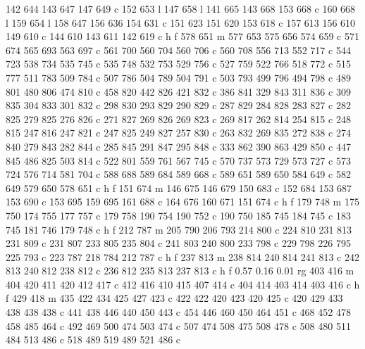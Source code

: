 {{        142 644 143 647 147 649 c
        152 653 l
        147 658 l
        141 665 143 668 153 668 c
        160 668 l
        159 654 l
        158 647 156 636 154 631 c
        151 623 151 620 153 618 c
        157 613 156 610 149 610 c
        144 610 143 611 142 619 c
        h f
        578 651 m
        577 653 575 656 574 659 c
        571 674 565 693 563 697 c
        561 700 560 704 560 706 c
        560 708 556 713 552 717 c
        544 723 538 734 535 745 c
        535 748 532 753 529 756 c
        527 759 522 766 518 772 c
        515 777 511 783 509 784 c
        507 786 504 789 504 791 c
        503 793 499 796 494 798 c
        489 801 480 806 474 810 c
        458 820 442 826 421 832 c
        386 841 329 843 311 836 c
        309 835 304 833 301 832 c
        298 830 293 829 290 829 c
        287 829 284 828 283 827 c
        282 825 279 825 276 826 c
        271 827 269 826 269 823 c
        269 817 262 814 254 815 c
        248 815 247 816 247 821 c
        247 825 249 827 257 830 c
        263 832 269 835 272 838 c
        274 840 279 843 282 844 c
        285 845 291 847 295 848 c
        333 862 390 863 429 850 c
        447 845 486 825 503 814 c
        522 801 559 761 567 745 c
        570 737 573 729 573 727 c
        573 724 576 714 581 704 c
        588 688 589 684 589 668 c
        589 651 589 650 584 649 c
        582 649 579 650 578 651 c
        h f
        151 674 m
        146 675 146 679 150 683 c
        152 684 153 687 153 690 c
        153 695 159 695 161 688 c
        164 676 160 671 151 674 c
        h f
        179 748 m
        175 750 174 755 177 757 c
        179 758 190 754 190 752 c
        190 750 185 745 184 745 c
        183 745 181 746 179 748 c
        h f
        212 787 m
        205 790 206 793 214 800 c
        224 810 231 813 231 809 c
        231 807 233 805 235 804 c
        241 803 240 800 233 798 c
        229 798 226 795 225 793 c
        223 787 218 784 212 787 c
        h f
        237 813 m
        238 814 240 814 241 813 c
        242 813 240 812 238 812 c
        236 812 235 813 237 813 c
        h f
        0.57 0.16 0.01 rg
        403 416 m
        404 420 411 420 412 417 c
        412 416 410 415 407 414 c
        404 414 403 414 403 416 c
        h f
        429 418 m
        435 422 434 425 427 423 c
        422 422 420 423 420 425 c
        420 429 433 438 438 438 c
        441 438 446 440 450 443 c
        454 446 460 450 464 451 c
        468 452 478 458 485 464 c
        492 469 500 474 503 474 c
        507 474 508 475 508 478 c
        508 480 511 484 513 486 c
        518 489 519 489 521 486 c
}}
